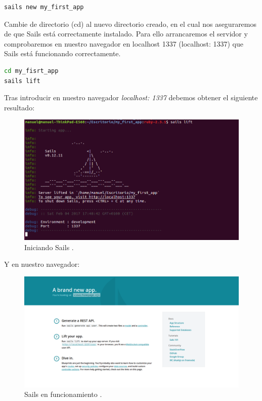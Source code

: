 \begin{lstlisting}[language=bash]
sails new my_first_app
\end{lstlisting}

Cambie de directorio (cd) al nuevo directorio creado, en el cual nos aseguraremos de que Sails está correctamente instalado. Para ello arrancaremos el servidor y comprobaremos en nuestro navegador en localhost 1337 (localhost: 1337) que Sails está funcionando correctamente.\\


\begin{lstlisting}[language=bash]
cd my_fisrt_app
sails lift
\end{lstlisting}


Tras introducir en nuestro navegador \emph{localhost: 1337} debemos obtener el siguiente resultado:


\begin{figure}[H]
  \begin{center}
    \includegraphics[scale=0.3]{imagenes/running_sails.png}
  \end{center}
  \label{fig:logo}
 \caption{Iniciando Sails \protect\footnotemark.}
\end{figure}


Y en nuestro navegador:\\

\begin{figure}[H]
  \begin{center}
    \includegraphics[scale=0.3]{imagenes/browser_sails.png}
  \end{center}
  \label{fig:logo}
 \caption{Sails en funcionamiento \protect\footnotemark.}
\end{figure}



